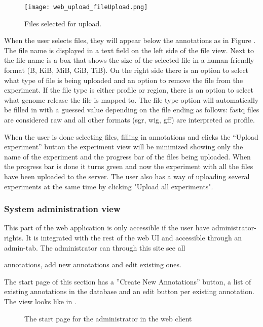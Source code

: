 \begin{sidewaysfigure}[h]
\centering
\texttt{[image: web\_upload\_fileUpload.png]}
\caption{\label{fig:web_upload_fileUpload}Files selected for upload.}
\end{sidewaysfigure}
 
When the user selects files, they will appear below the annotations as in Figure . The file name is displayed in a text field on the left side of the file view. Next to the file name is a box that shows the size of the selected file in a human friendly format (B, KiB, MiB, GiB, TiB). On the right side there is an option to select what type of file is being uploaded and an option to remove the file from the experiment. If the file type is either profile or region, there is an option to select what genome release the file is mapped to. The file type option will automatically be filled in with a guessed value depending on the file ending as follows: fastq files are considered raw and all other formats (sgr, wig, gff) are interpreted as profile.

When the user is done selecting files, filling in annotations and clicks the “Upload experiment” button the experiment view will be minimized showing only the name of the experiment and the progress bar of the files being uploaded. When the progress bar is done it turns green and now the experiment with all the files have been uploaded to the server. The user also has a way of uploading several experiments at the same time by clicking "Upload all experiments". 

\subsubsection{System administration view}

This part of the web application is only accessible if the user have administrator-rights. It is integrated with the rest of the web UI and accessible through an admin-tab. The administrator can through this site see all 

annotations, add new annotations and edit existing ones.

The start page of this section has a ''Create New Annotations'' button, a list of existing annotations in the database and an edit button per existing annotation. 
The view looks like in . 

\begin{sidewaysfigure}[h]
 \caption{The start page for the administrator in the web client}
 \label{adm__web_annotationView}
\end{sidewaysfigure}

